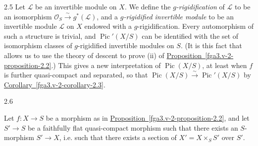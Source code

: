 \begin{remark}{2.5}
    Let \(\mathscr {L}\) be an invertible module on \(X\).
    We define the \emph{\(g\)-rigidification} of \(\mathscr {L}\) to be an isomorphism \(\mathcal {O}_S\xrightarrow {\sim } g^*(\mathscr {L})\), and a \emph{\(g\)-rigidified invertible module} to be an invertible module \(\mathscr {L}\) on \(X\) endowed with a \(g\)-rigidification.
    Every automorphism of such a structure is trivial, and \(\operatorname {Pic}'(X/S)\) can be identified with the set of isomorphism classes of \(g\)-rigidified invertible modules on \(S\).
    (It is this fact that allows us to use the theory of descent to prove (ii) of \hyperref[fga3.v-2-proposition-2.2]{Proposition~\ref*{fga3.v-2-proposition-2.2}}.)
    This gives a new interpretation of \(\operatorname {Pic}(X/S)\), at least when \(f\) is further quasi-compact and separated, so that \(\operatorname {Pic}(X/S)\xrightarrow {\sim }\operatorname {Pic}'(X/S)\) by \hyperref[fga3.v-2-corollary-2.3]{Corollary~\ref*{fga3.v-2-corollary-2.3}}.\end{remark}\begin{remark}{2.6}\label{fga3.v-2-remark-2.6}\skipsinglepar\par{}Let \(f\colon  X\to  S\) be a morphism as in \hyperref[fga3.v-2-proposition-2.2]{Proposition~\ref*{fga3.v-2-proposition-2.2}}, and let \(S'\to  S\) be a faithfully flat quasi-compact morphism such that there exists an \(S\)-morphism \(S'\to  X\), i.e. such that there exists a section of \(X'=X\times _S S'\) over \(S'\).
    

\end{remark}
